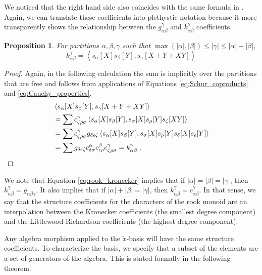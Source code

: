 \documentclass{amsart}
\newtheorem{prop}[lemma]{Proposition}
\theoremstyle{definition}
\newcommand{\xt}{\tilde x}
\begin{document}
We noticed that the right hand side also coincides with the same formula in \cite[Lemma 4.2]{Ying22}. Again, we can translate these coefficients into plethystic notation
because it more transparently shows the relationship between
the $\overline{g}_{\alpha\beta}^\gamma$ and $k_{\alpha\beta}^\gamma$ coefficients.

\begin{prop}\label{prop:pleth_rook_structure}
For partitions $\alpha, \beta, \gamma$ such that $\max(|\alpha|, |\beta|) \leq |\gamma| \leqslant |\alpha|+|\beta|$,
\[
k_{\alpha\beta}^\gamma = \left< s_\alpha[X] s_\beta[Y], s_\gamma[X+Y+XY] \right>
\]
\end{prop}

\begin{proof} Again, in the following calculation the sum is implicitly over the partitions that are free
and follows from applications of Equations \eqref{eq:Schur_coproducts}
and \eqref{eq:Cauchy_properties}.
\begin{align*}
&\left< s_\alpha[X] s_\beta[Y], s_\gamma[X+Y+XY] \right>\\
&=\sum c^\gamma_{\zeta\rho\sigma} \left< s_\alpha[X] s_\beta[Y], s_\sigma[X]s_\rho[Y]s_\zeta[XY] \right>\\
&= \sum c^\gamma_{\zeta\rho\sigma}
g_{\delta\epsilon\zeta} \left< s_\alpha[X] s_\beta[Y], s_\sigma[X]s_\rho[Y]s_\delta[X]s_\epsilon[Y] \right>\\
&=\sum
g_{\delta\epsilon\zeta} c^\alpha_{\delta\sigma} c^\beta_{\epsilon\rho} c^\gamma_{\zeta\rho\sigma}
= k_{\alpha\beta}^\gamma~.\qedhere
\end{align*}
\end{proof}

We note that Equation \eqref{eq:rook_kronecker} implies that
if $|\alpha|=|\beta|=|\gamma|$, then $k_{\alpha\beta}^\gamma=g_{\alpha\beta\gamma}$.
It also implies that if $|\alpha|+|\beta|=|\gamma|$, then
$k_{\alpha\beta}^\gamma=c_{\alpha\beta}^\gamma$.  In that sense,
we say that the structure coefficients for the characters of the
rook monoid are an interpolation between the Kronecker coefficients
(the smallest degree component)
and the Littlewood-Richardson coefficients (the highest degree component).

Any algebra morphism applied to the $\xt$-basis will
have the same structure coefficients.  To characterize the basis,
we specify that a subset of the elements are a set of generators of the algebra.
This is stated formally in the following theorem.
\end{document}
